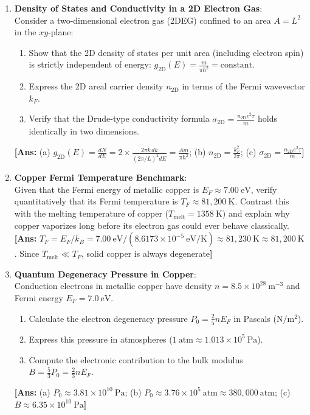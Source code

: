 \documentclass[11pt,a4paper]{article}
\begin{document}
\begin{enumerate}[label=\textbf{\arabic*.}, resume, leftmargin=*]
    \item \textbf{Density of States and Conductivity in a 2D Electron Gas}:\\
    Consider a two-dimensional electron gas (2DEG) confined to an area $A = L^2$ in the $xy$-plane:
    \begin{enumerate}[label=(\alph*)]
        \item Show that the 2D density of states per unit area (including electron spin) is strictly independent of energy: $g_{\mathrm{2D}}(E) = \frac{m}{\pi\hbar^2} = \mathrm{constant}$.
        \item Express the 2D areal carrier density $n_{\mathrm{2D}}$ in terms of the Fermi wavevector $k_F$.
        \item Verify that the Drude-type conductivity formula $\sigma_{\mathrm{2D}} = \frac{n_{\mathrm{2D}} e^2 \tau}{m}$ holds identically in two dimensions.
    \end{enumerate}
    \textbf{[Ans:} (a) $g_{\mathrm{2D}}(E) = \frac{dN}{dE} = 2 \times \frac{2\pi k\,dk}{(2\pi/L)^2 dE} = \frac{A m}{\pi\hbar^2}$; (b) $n_{\mathrm{2D}} = \frac{k_F^2}{2\pi}$; (c) $\sigma_{\mathrm{2D}} = \frac{n_{\mathrm{2D}} e^2 \tau}{m}$\textbf{]}

    \item \textbf{Copper Fermi Temperature Benchmark}:\\
    Given that the Fermi energy of metallic copper is $E_F \approx 7.00\ \mathrm{eV}$, verify quantitatively that its Fermi temperature is $T_F \approx 81{,}200\ \mathrm{K}$. Contrast this with the melting temperature of copper ($T_{\mathrm{melt}} = 1358\ \mathrm{K}$) and explain why copper vaporizes long before its electron gas could ever behave classically.
    \textbf{[Ans:} $T_F = E_F/k_B = 7.00\ \mathrm{eV} / (8.6173 \times 10^{-5}\ \mathrm{eV/K}) \approx 81{,}230\ \mathrm{K} \approx 81{,}200\ \mathrm{K}$. Since $T_{\mathrm{melt}} \ll T_F$, solid copper is always degenerate\textbf{]}

    \item \textbf{Quantum Degeneracy Pressure in Copper}:\\
    Conduction electrons in metallic copper have density $n = 8.5 \times 10^{28}\ \mathrm{m^{-3}}$ and Fermi energy $E_F = 7.0\ \mathrm{eV}$.
    \begin{enumerate}[label=(\alph*)]
        \item Calculate the electron degeneracy pressure $P_0 = \frac{2}{5}n E_F$ in Pascals ($\mathrm{N/m^2}$).
        \item Express this pressure in atmospheres ($1\ \mathrm{atm} \approx 1.013 \times 10^5\ \mathrm{Pa}$).
        \item Compute the electronic contribution to the bulk modulus $B = \frac{5}{3}P_0 = \frac{2}{3}n E_F$.
    \end{enumerate}
    \textbf{[Ans:} (a) $P_0 \approx 3.81 \times 10^{10}\ \mathrm{Pa}$; (b) $P_0 \approx 3.76 \times 10^5\ \mathrm{atm} \approx 380{,}000\ \mathrm{atm}$; (c) $B \approx 6.35 \times 10^{10}\ \mathrm{Pa}$\textbf{]}


\end{enumerate}
\end{document}
